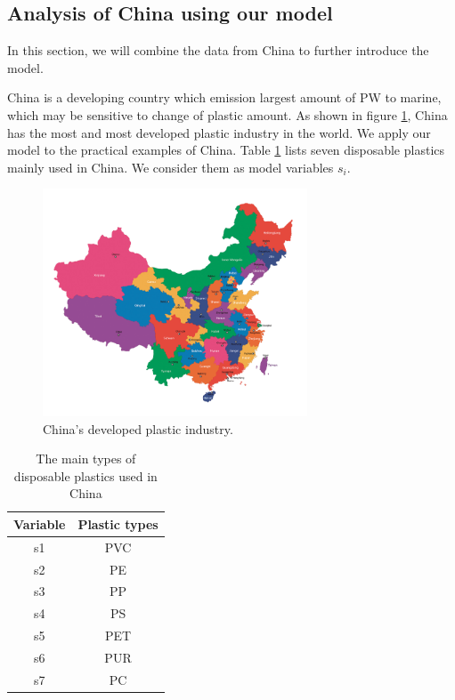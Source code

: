 \documentclass{mcmthesis}
\begin{document}
\subsection{Analysis of China using our model}

In this section, we will combine the data from China to further introduce the model.

China is a developing country which emission largest amount of PW to marine, which may be sensitive to change of plastic amount. As shown in figure \ref{fig09}, China has the most and most developed plastic industry in the world. We apply our model to the practical examples of China. Table \ref{type} lists seven disposable plastics mainly used in China. We consider them as model variables $s_i$.

\begin{figure}[!htb] %
	\centering %
	\includegraphics[width=0.7\textwidth]{figures/Map.png} %
	\caption{China's developed plastic industry.} %
	\label{fig09} %
	
\end{figure}

\begin{table}[]
	\center
	\caption{The main types of disposable plastics used in China}
	\label{type}
	\begin{tabular}{|c|c|}
		\hline
		\textbf{Variable} & \textbf{Plastic types} \\ \hline
		s1                & PVC                    \\ \hline
		s2                & PE                     \\ \hline
		s3                & PP                     \\ \hline
		s4                & PS                     \\ \hline
		s5                & PET                    \\ \hline
		s6                & PUR                    \\ \hline
		s7                & PC                     \\ \hline
	\end{tabular}
\end{table}
\end{document}
